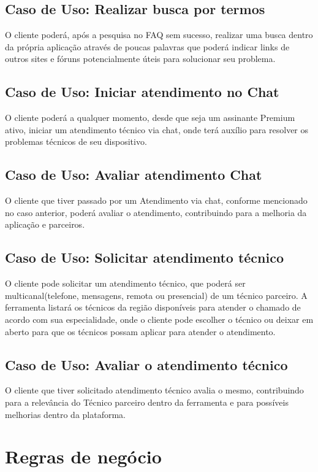\documentclass[
    12pt,               %
    openright,          %
    oneside,
    a4paper,            %
    english,            %
    brazil              %
   ]{ifsp-spo-inf-ctds}
\begin{document}
\subsection{Caso de Uso: Realizar busca por termos}
O cliente poderá, após a pesquisa no FAQ sem sucesso, realizar uma busca dentro da própria aplicação através de poucas palavras que poderá indicar links de outros sites e fóruns potencialmente úteis para solucionar seu problema.

\subsection{Caso de Uso: Iniciar atendimento no Chat}
O cliente poderá a qualquer momento, desde que seja um assinante Premium ativo, iniciar um atendimento técnico via chat, onde terá auxílio para resolver os problemas técnicos de seu dispositivo.

\subsection{Caso de Uso: Avaliar atendimento Chat}
O cliente que tiver passado por um Atendimento via chat, conforme mencionado no caso anterior, poderá avaliar o atendimento, contribuindo para a melhoria da aplicação e parceiros.

\subsection{Caso de Uso: Solicitar atendimento técnico}
O cliente pode solicitar um atendimento técnico, que poderá ser multicanal(telefone, mensagens, remota ou presencial) de um técnico parceiro. A ferramenta listará os técnicos da região disponíveis para atender o chamado de acordo com sua especialidade, onde o cliente pode escolher o técnico ou deixar em aberto para que os técnicos possam aplicar para atender o atendimento.

\subsection{Caso de Uso: Avaliar o atendimento técnico}
O cliente que tiver solicitado atendimento técnico avalia o mesmo, contribuindo para a relevância do Técnico parceiro dentro da ferramenta e para possíveis melhorias dentro da plataforma.

\section{Regras de negócio}
\end{document}
